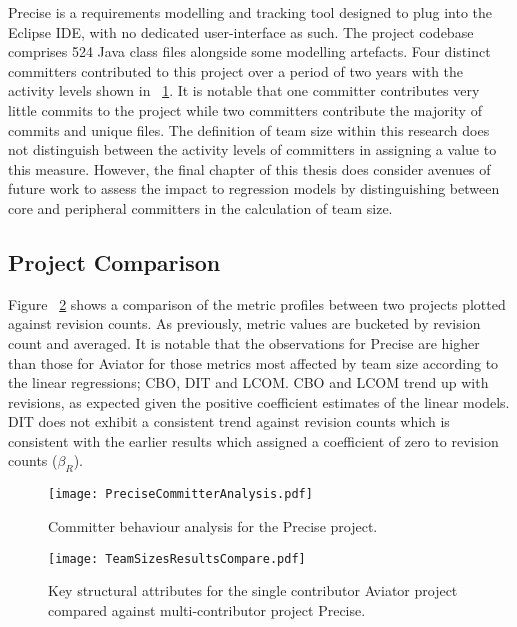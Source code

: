 Precise is a requirements modelling and tracking tool designed to plug into the Eclipse IDE, with no dedicated user-interface as such. The project codebase comprises 524 Java class files alongside some modelling artefacts. Four distinct committers contributed to this project over a period of two years with the activity levels shown in ~\ref{fig:PreciseCommitterAnalysis}. It is notable that one committer contributes very little commits to the project while two committers contribute the majority of commits and unique files. The definition of team size within this research does not distinguish between the activity levels of committers in assigning a value to this measure. However, the final chapter of this thesis does consider avenues of future work to assess the impact to regression models by distinguishing between core and peripheral committers in the calculation of team size.

\subsection{Project Comparison}
Figure ~\ref{fig:TeamSizesResultsCompare} shows a comparison of the metric profiles between two projects plotted against revision counts. As previously, metric values are bucketed by revision count and averaged. It is notable that the observations for Precise are higher than those for Aviator for those metrics most affected by team size according to the linear regressions; CBO, DIT and LCOM. CBO and LCOM trend up with revisions, as expected given the positive coefficient estimates of the linear models. DIT does not exhibit a consistent trend against revision counts which is consistent with the earlier results which assigned a coefficient of zero to revision counts ($\beta_R$). 

\begin{figure}[htbp!] 
\centering    
\texttt{[image: PreciseCommitterAnalysis.pdf]}
\caption{Committer behaviour analysis for the Precise project.}
\label{fig:PreciseCommitterAnalysis}
\end{figure}

\begin{figure}[htbp!] 
\centering    
\texttt{[image: TeamSizesResultsCompare.pdf]}
\caption{Key structural attributes for the single contributor Aviator project compared against multi-contributor project Precise.}
\label{fig:TeamSizesResultsCompare}
\end{figure}

